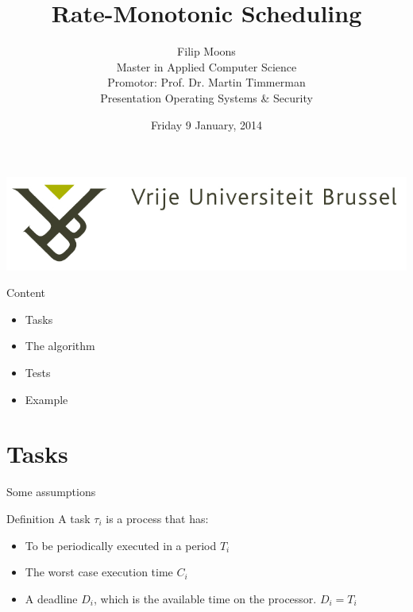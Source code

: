 \documentclass{beamer}
\title{Rate-Monotonic Scheduling}
\author{Filip Moons\\Master in Applied Computer Science\\Promotor: Prof. Dr. Martin Timmerman\\Presentation Operating Systems \& Security}
\date{Friday 9 January, 2014}
\begin{document}
\begin{frame}[plain]
\includegraphics[width=0.4\paperwidth]{VUB_logo.jpg}
\vspace{2cm}
\titlepage
\end{frame}



%
%
%
%

\begin{frame}{Content}
\begin{itemize}
  \item Tasks
  \item The algorithm
  \item Tests
  \item Example
  \end{itemize}

\end{frame}



\section{Tasks}
\begin{frame}{Some assumptions}
\begin{block}{Definition}
A task $\tau_i$ is a process that has:
\begin{itemize}
        \item To be periodically executed in a period $T_i$       
         \item The worst case execution time $C_i$
        \item A deadline $D_i$, which is the available time on the processor. $D_i = T_i$
        \end{itemize}
\end{block}
    
\end{frame}
\end{document}
